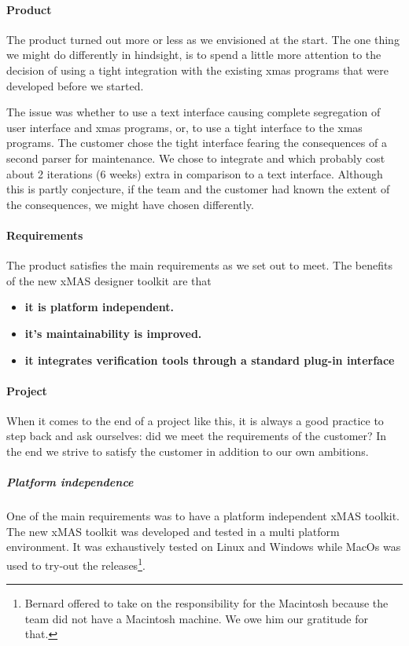 \paragraph{Product} The product turned out more or less as we envisioned at the start. The one
thing we might do differently in hindsight, is to spend a little more attention to the decision
of using a tight integration with the existing xmas programs that were developed before we started.

The issue was whether to use a text interface causing complete segregation of user interface and
xmas programs, or, to use a tight interface to the xmas programs. The customer chose the tight 
interface fearing the consequences of a second parser for maintenance. We chose to integrate
\qml and \cpp which probably cost about 2 iterations (6 weeks) extra in comparison to a text
interface. Although this is partly conjecture, if the team and the customer had known the extent 
of the consequences, we might have chosen differently.

\paragraph{Requirements}
The product satisfies  the main requirements as we set out to meet. 
The benefits of the new xMAS designer toolkit are that
\begin{itemize}
\item \textbf{it is platform independent.}
\item \textbf{it's maintainability is improved.}
\item \textbf{it integrates verification tools through
			 a standard plug-in interface}
\end{itemize}

\paragraph{Project} When it comes to the end of a project like this, it is always a good practice to
step back and ask ourselves: did we meet the requirements of the customer? In the end we strive
to satisfy the customer in addition to our own ambitions.

\subparagraph{Platform independence} One of the main requirements was to have a platform independent xMAS
toolkit. The new xMAS toolkit was developed and tested in a multi platform
environment. It was exhaustively tested on Linux and Windows while MacOs was used to
try-out the releases\footnote{Bernard offered to take on the responsibility for the Macintosh 
because the team did not have a Macintosh machine. We owe him our gratitude for that.}.

